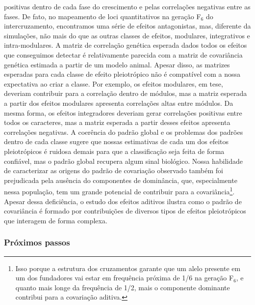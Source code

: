 \begin{refsection}
positivas dentro de cada fase do crescimento e pelas correlações negativas
entre as fases. De fato, no mapeamento de loci quantitativos na geração F$_6$
do intercruzamento, encontramos uma série de efeitos antagonistas, mas,
diferente da simulações, não mais do que as outras classes de efeitos,
modulares, integrativos e intra-modulares. A matriz de correlação genética
esperada dados todos os efeitos que conseguimos detectar é relativamente
parecida com a matriz de covariância genética estimada a partir de um modelo
animal. Apesar disso, as matrizes esperadas para cada classe de efeito
pleiotrópico não é compatível com a nossa expectativa ao criar a classe. Por
exemplo, os efeitos modulares, em tese, deveriam contribuir para a correlação
dentro de módulos, mas a matriz esperada a partir dos efeitos modulares
apresenta correlações altas entre módulos. Da mesma forma, os efeitos
integradores deveriam gerar correlações positivas entre todos os caracteres,
mas a matriz esperada a partir desses efeitos apresenta correlações negativas.
A coerência do padrão global e os problemas dos padrões dentro de cada classe
sugere que nossas estimativas de cada um dos efeitos pleiotrópicos é ruidosa
demais para que a classificação seja feita de forma confiável, mas o padrão
global recupera algum sinal biológico. Nossa habilidade de caracterizar as
origens do padrão de covariação observado também foi prejudicada pela ausência
do componentes de dominância, que, especialmente nessa população, tem um
grande potencial de contribuir para a covariância\footnote{Isso porque a
estrutura dos cruzamentos garante que um alelo presente em um dos fundadores
vai estar em frequência próxima de 1/6 na geração F$_6$, e quanto mais longe
da frequência de 1/2, mais o componente dominante contribui para a
covariação aditiva.}. Apesar dessa deficiência, o estudo dos efeitos aditivos ilustra
como o padrão de covariância é formado por contribuições de diversos tipos de
efeitos pleiotrópicos que interagem de forma complexa.

\subsubsection{Próximos passos}


\end{refsection}
